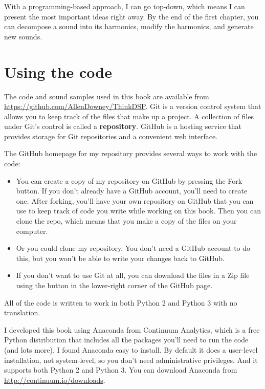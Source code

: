 \documentclass[12pt]{book}
\begin{document}
With a programming-based approach, I can go top-down, which means I
can present the most important ideas right away.  By the end of the
first chapter, you can decompose a sound into its harmonics, modify
the harmonics, and generate new sounds.

\section{Using the code}
\label{code}

The code and sound samples used in this book are available from
\url{https://github.com/AllenDowney/ThinkDSP}.  Git is a version
control system that allows you to keep track of the files that
make up a project.  A collection of files under Git's control is
called a {\bf repository}.  GitHub is a hosting service that provides
storage for Git repositories and a convenient web interface.

The GitHub homepage for my repository provides several ways to
work with the code:

\begin{itemize}

\item You can create a copy of my repository
on GitHub by pressing the {\sf Fork} button.  If you don't already
have a GitHub account, you'll need to create one.  After forking, you'll
have your own repository on GitHub that you can use to keep track
of code you write while working on this book.  Then you can
clone the repo, which means that you make a copy of the files
on your computer.

\item Or you could clone
my repository.  You don't need a GitHub account to do this, but you
won't be able to write your changes back to GitHub.

\item If you don't want to use Git at all, you can download the files
in a Zip file using the button in the lower-right corner of the
GitHub page.

\end{itemize}

All of the code is written to work in both Python 2 and Python 3
with no translation.

I developed this book using Anaconda from
Continuum Analytics, which is a free Python distribution that includes
all the packages you'll need to run the code (and lots more).
I found Anaconda easy to install.  By default it does a user-level
installation, not system-level, so you don't need administrative
privileges.  And it supports both Python 2 and Python 3.  You can
download Anaconda from \url{http://continuum.io/downloads}.
\end{document}
